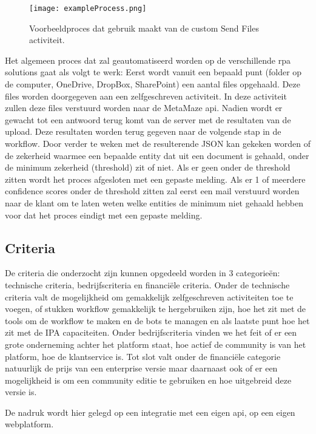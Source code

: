 \begin{figure}[h]
	\texttt{[image: exampleProcess.png]}
	\caption[Te automatiseren demoproces]{Voorbeeldproces dat gebruik maakt van de custom Send Files activiteit.}
	\label{fig:exampleProcess}
\end{figure}

Het algemeen proces dat zal geautomatiseerd worden op de verschillende \acrshort{rpa} solutions gaat als volgt te werk: Eerst wordt vanuit een bepaald punt (folder op de computer, OneDrive, DropBox, SharePoint) een aantal files opgehaald. Deze files worden doorgegeven aan een zelfgeschreven activiteit. In deze activiteit zullen deze files verstuurd worden naar de MetaMaze \acrshort{api}. Nadien wordt er gewacht tot een antwoord terug komt van de server met de resultaten van de upload. Deze resultaten worden terug gegeven naar de volgende stap in de workflow. Door verder te weken met de resulterende JSON kan gekeken worden of de zekerheid waarmee een bepaalde entity dat uit een document is gehaald, onder de minimum zekerheid (threshold) zit of niet. Als er geen onder de threshold zitten wordt het proces afgesloten met een gepaste melding. Als er 1 of meerdere confidence scores onder de threshold zitten zal eerst een mail verstuurd worden naar de klant om te laten weten welke entities de minimum niet gehaald hebben voor dat het proces eindigt met een gepaste melding.

\subsection{Criteria}
De criteria die onderzocht zijn kunnen opgedeeld worden in 3 categorieën: technische criteria, bedrijfscriteria en financiële criteria. Onder de technische criteria valt de mogelijkheid om gemakkelijk zelfgeschreven activiteiten toe te voegen, of stukken workflow gemakkelijk te hergebruiken zijn, hoe het zit met de tools om de workflow te maken en de bots te managen en als laatste punt hoe het zit met de IPA capaciteiten. Onder bedrijfscriteria vinden we het feit of er een grote onderneming achter het platform staat, hoe actief de community is van het platform, hoe de klantservice is. Tot slot valt onder de financiële categorie natuurlijk de prijs van een enterprise versie maar daarnaast ook of er een mogelijkheid is om een community editie te gebruiken en hoe uitgebreid deze versie is.

De nadruk wordt hier gelegd op een integratie met een eigen \acrshort{api}, op een eigen webplatform.

